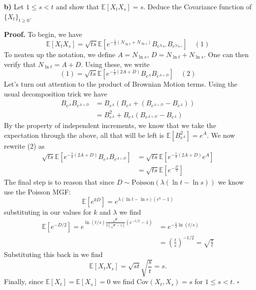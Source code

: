 \documentclass{article}
\begin{document}
\begin{tcolorbox}
[colframe=black,colback=gray!5,boxrule=0.5pt]
\textbf{b)} Let $1 \leq s < t$ and show that $\mathbb{E}[X_tX_s] = s$. Deduce the Covariance function of $\{X_t\}_{t\geq0}$. 
\end{tcolorbox}
\textbf{Proof.} To begin, we have 
$$\mathbb{E}[X_tX_s] = \sqrt{ts}\mathbb{E}[e^{-\frac{1}{2}(N_{\ln t} + N_{\ln s})}B_{e^{N_{\ln t}}}B_{e^{N_{\ln s}}}] \quad (1)$$
To neaten up the notation, we define $A = N_{\ln s}$, $D = N_{\ln t} + N_{\ln s}$. One can then verify that $N_{\ln t} = A + D$. Using these, we write 
$$(1) = \sqrt{ts}\mathbb{E}[e^{-\frac{1}{2}(2A+D)}B_{e^A}B_{e^{A+D}}] \quad (2)$$
Let's turn out attention to the product of Brownian Motion terms. Using the usual decomposition trick we have 
\begin{align*}
    B_{e^A}B_{e^{A+D}} &= B_{e^A}(B_{e^A} + (B_{e^{A+D}} - B_{e^A})) \\
    &= B_{e^A}^2 + B_{e^A}(B_{e^{A+D}} - B_{e^A})
\end{align*}
By the property of independent increments, we know that we take the expectation through the above, all that will be left is $\mathbb{E}[B_{e^A}^2] = e^A$. We now rewrite (2) as 
\begin{align*}
    \sqrt{ts}\mathbb{E}[e^{-\frac{1}{2}(2A+D)}B_{e^A}B_{e^{A+D}}] &= \sqrt{ts}\mathbb{E}[e^{-\frac{1}{2}(2A+D)}e^A] \\
    &= \sqrt{ts}\mathbb{E}[e^{-\frac{D}{2}}]
\end{align*}
The final step is to reason that since $D\sim\text{Poisson}(\lambda(\ln t - \ln s))$ we know use the Poisson MGF: 
$$\mathbb{E}[e^{kD}] = e^{\lambda(\ln t - \ln s)(e^{k} -1)}$$
substituting in our values for $k$ and $\lambda$ we find 
\begin{align*}
    \mathbb{E}[e^{-D/2}] = e^{\ln(t/s) \frac{\sqrt{e}}{2(\sqrt{e}-1)}(e^{-1/2} - 1)} &= e^{-\frac{1}{2}\ln (t/s)}  \\
    &= \left(\frac{t}{s}\right)^{-1/2} = \sqrt{\frac{s}{t}}
\end{align*}
Substituting this back in we find
$$\mathbb{E}[X_t X_s] = \sqrt{st} \sqrt{\frac{s}{t}} = s.$$
Finally, since $\mathbb{E}[X_t] = \mathbb{E}[X_s] = 0$ we find Cov$(X_t, X_s) = s$ for $1 \leq s < t$. $\square$
\end{document}
